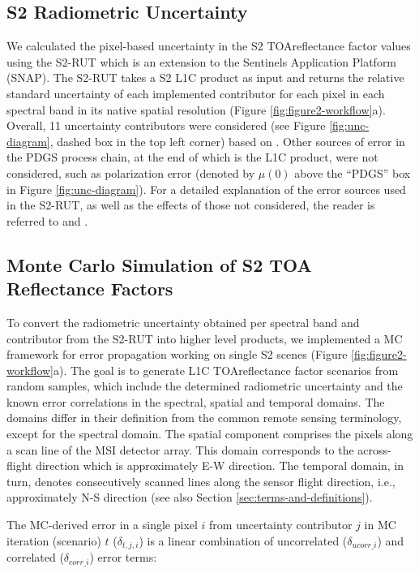 \subsection{S2 Radiometric Uncertainty}
\label{subsec:s2-rut}
We calculated the pixel-based uncertainty in the \gls{S2} \gls{TOA}reflectance factor values using the \gls{S2-RUT} which is an extension to the Sentinels Application Platform (SNAP). The \gls{S2-RUT} takes a \gls{S2} L1C product as input and returns the relative standard uncertainty of each implemented contributor for each pixel in each spectral band in its native spatial resolution (Figure \ref{fig:figure2-workflow}a). Overall, 11 uncertainty contributors were considered (see Figure \ref{fig:unc-diagram}, dashed box in the top left corner) based on \cite{gorrono_providing_2018}. Other sources of error in the PDGS process chain, at the end of which is the L1C product, were not considered, such as polarization error (denoted by $\mu(0)$ above the ``PDGS'' box in Figure \ref{fig:unc-diagram}). For a detailed explanation of the error sources used in the S2-RUT, as well as the effects of those not considered, the reader is referred to \cite{gorrono_radiometric_2017} and \cite{gorrono_providing_2018}. 

\subsection{Monte Carlo Simulation of \gls{S2} \gls{TOA} Reflectance Factors}
\label{subsec:mc_sim_l1c}

To convert the radiometric uncertainty obtained per spectral band and contributor from the \gls{S2-RUT} into higher level products, we implemented a \gls{MC} framework for error propagation working on single \gls{S2} scenes (Figure \ref{fig:figure2-workflow}a). The goal is to generate L1C \gls{TOA}reflectance factor scenarios from random samples, which include the determined radiometric uncertainty and the known error correlations in the spectral, spatial and temporal domains. The domains differ in their definition from the common remote sensing terminology, except for the spectral domain. The spatial component comprises the pixels along a scan line of the \gls{MSI} detector array. This domain corresponds to the across-flight direction which is approximately E-W direction. The temporal domain, in turn, denotes consecutively scanned lines along the sensor flight direction, i.e., approximately N-S direction (see also Section \ref{sec:terms-and-definitions}).

The MC-derived error in a single pixel $i$ from uncertainty contributor $j$ in \gls{MC} iteration (scenario) $t$ ($\delta_{t,j,i}$) is a linear combination of uncorrelated ($\delta_{ucorr\_i}$) and correlated ($\delta_{corr\_i}$) error terms:

